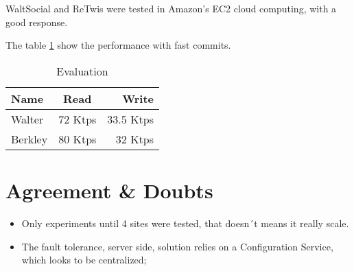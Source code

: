 \documentclass[a4paper]{article}
\begin{document}
WaltSocial and ReTwis were tested in Amazon's EC2 cloud computing, with a good response.

The table \ref{tab-evaluation} show the performance with fast commits.

\begin{table}[center]
\begin{tabular}{ l c r }
	\hline
   Name & Read & Write \\
   \hline
   Walter & 72 Ktps & 33.5 Ktps \\
   Berkley & 80 Ktps & 32 Ktps \\
 \end{tabular}
 \caption{\label{tab-evaluation} Evaluation}
 \end{table}


\section{Agreement \& Doubts}

\begin{itemize}
\item Only experiments until 4 sites were tested, that doesn´t means it really scale.
\item The fault tolerance, server side, solution relies on a Configuration Service, which looks to be centralized;
\end{itemize}
\end{document}
